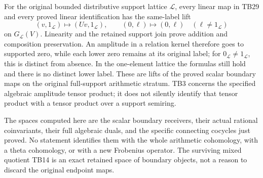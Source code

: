 For the original bounded distributive support lattice
\(\mathcal L\), every linear map in TB29 and every proved
linear identification has the same-label lift
\[
(v,1_{\mathcal L})\longmapsto(Uv,1_{\mathcal L}),
\qquad
(0,\ell)\longmapsto(0,\ell)\quad(\ell\ne1_{\mathcal L})
\]
on \(G_{\mathcal L}(V)\). Linearity and the retained support
join prove addition and composition preservation.
An amplitude in a relation kernel therefore goes to supported
zero, while each lower zero remains at its original label;
for \(0_{\mathcal L}\ne1_{\mathcal L}\), this is distinct from
absence. In the one-element lattice the formulas still hold
and there is no distinct lower label.
These are lifts of the proved scalar boundary maps on the original
full-support arithmetic stratum. TB3 concerns the specified
algebraic amplitude tensor product; it does not silently identify
that tensor product with a tensor product over a support semiring.

The spaces computed here are the scalar boundary receivers,
their actual rational coinvariants, their full algebraic duals,
and the specific connecting cocycles just proved. No statement
identifies them with the whole arithmetic cohomology, with a
theta cohomology, or with a new Frobenius operator. The surviving
mixed quotient TB14 is an exact retained space of boundary
objects, not a reason to discard the original endpoint maps.
